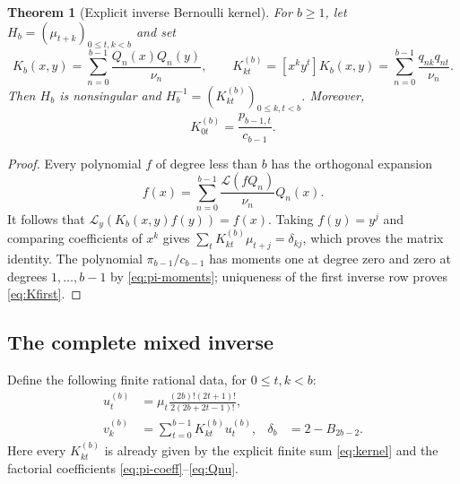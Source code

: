 \documentclass[11pt,letterpaper]{article}
\newtheorem{theorem}{Theorem}[section]
\theoremstyle{definition}
\theoremstyle{remark}
\numberwithin{equation}{section}
\begin{document}
\begin{theorem}[Explicit inverse Bernoulli kernel]
\label{thm:kernel}
For $b\geq1$, let $H_b=(\mu_{t+k})_{0\leq t,k<b}$ and set
\begin{equation}\label{eq:kernel}
 K_b(x,y)=\sum_{n=0}^{b-1}\frac{Q_n(x)Q_n(y)}{\nu_n},
 \qquad
 K_{kt}^{(b)}=[x^ky^t]K_b(x,y)
 =\sum_{n=0}^{b-1}\frac{q_{nk}q_{nt}}{\nu_n}.
\end{equation}
Then $H_b$ is nonsingular and
$H_b^{-1}=(K_{kt}^{(b)})_{0\leq k,t<b}$.
Moreover,
\begin{equation}\label{eq:Kfirst}
 K_{0t}^{(b)}=\frac{p_{b-1,t}}{c_{b-1}}.
\end{equation}
\end{theorem}
\begin{proof}
Every polynomial $f$ of degree less than $b$ has the orthogonal
expansion
\[
 f(x)=\sum_{n=0}^{b-1}
   \frac{\mathcal L(fQ_n)}{\nu_n}Q_n(x).
\]
It follows that $\mathcal L_y(K_b(x,y)f(y))=f(x)$.
Taking $f(y)=y^j$ and comparing coefficients of $x^k$ gives
$\sum_tK_{kt}^{(b)}\mu_{t+j}=\delta_{kj}$, which proves the matrix
identity. The polynomial $\pi_{b-1}/c_{b-1}$ has moments one at
degree zero and zero at degrees $1,\ldots,b-1$ by
\eqref{eq:pi-moments}; uniqueness of the first inverse row proves
\eqref{eq:Kfirst}.
\end{proof}

\subsection{The complete mixed inverse}

Define the following finite rational data, for $0\leq t,k<b$:
\begin{align}
 u_t^{(b)}&=\mu_t
   \frac{(2b)!(2t+1)!}{2(2b+2t-1)!},
 \label{eq:ut}\\
 v_k^{(b)}&=\sum_{t=0}^{b-1}K_{kt}^{(b)}u_t^{(b)},
 &\delta_b&=2-B_{2b-2}.
 \label{eq:vkdelta}
\end{align}
Here every $K_{kt}^{(b)}$ is already given by the explicit finite sum
\eqref{eq:kernel} and the factorial coefficients
\eqref{eq:pi-coeff}--\eqref{eq:Qnu}.
\end{document}
